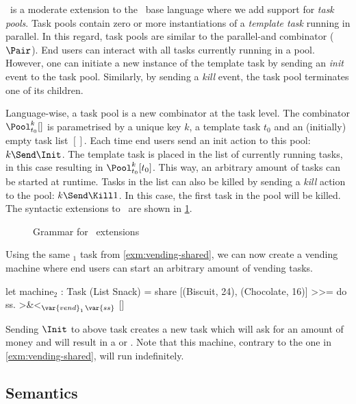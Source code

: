 \DYNTOPHAT\ is a moderate extension to the \TOPHAT\ base language where we add support for \emph{task pools}.
Task pools contain zero or more instantiations of a \emph{template task} running in parallel.
In this regard, task pools are similar to the parallel-and combinator ($\Pair$).
End users can interact with all tasks currently running in a pool.
However, one can initiate a new instance of the template task by sending an \emph{init} event to the task pool.
Similarly, by sending a \emph{kill} event, the task pool terminates one of its children.

Language-wise, a task pool is a new combinator at the task level.
The combinator $\Pool^k_{t_0} []$ is parametrised by a unique key $k$, a template task $t_0$ and an (initially) empty task list $[]$.
Each time end users send an init action to this pool: $k\Send\Init$.
The template task is placed in the list of currently running tasks,
in this case resulting in $\Pool^k_{t_0} [t_0]$.
This way, an arbitrary amount of tasks can be started at runtime.
Tasks in the list can also be killed by sending a \emph{kill} action to the pool: $k\Send\Kill1$.
In this case, the first task in the pool will be killed.
The syntactic extensions to \TOPHAT\ are shown in \cref{fig:dynamic-grammar}.


\begin{figure}
  \caption{Grammar for \DYNTOPHAT\ extensions}
  \label{fig:dynamic-grammar}
\end{figure}

\begin{example}
  \label{exm:vending-dynamic}
  Using the same $_1$ task from \cref{exm:vending-shared},
  we can now create a vending machine where end users can start an arbitrary amount of vending tasks.
  \begin{TASK}
    let machine$_2$ : Task (List Snack) =
      share [(Biscuit, 24), (Chocolate, 16)] >>= do ss.
      >&<$_{\var{vend}_1\,\var{ss}}$ []
  \end{TASK}
  Sending $\Init$ to above task creates a new  task
  which will ask for an amount of money and will result in a  or .
  Note that this machine, contrary to the one in \cref{exm:vending-shared}, will run indefinitely.
\end{example}


\subsection{Semantics}

